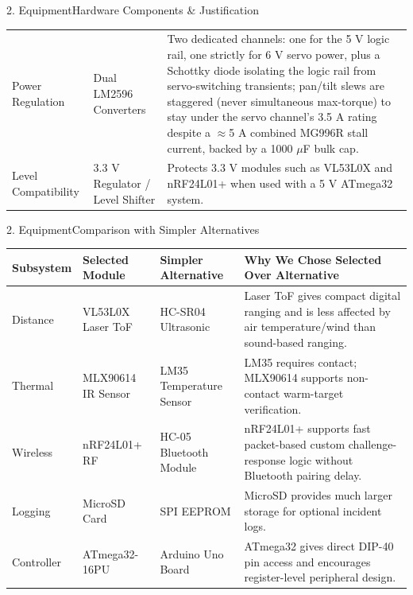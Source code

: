\documentclass[aspectratio=169, 10pt]{beamer}
\begin{document}
\begin{frame}{2. Equipment}{Hardware Components \& Justification}
\begin{table}
\begin{tabular}{p{2.15cm} p{2.85cm} p{5.6cm}}
            Power Regulation & Dual LM2596 Converters & Two dedicated channels: one for the 5 V logic rail, one strictly for 6 V servo power, plus a Schottky diode isolating the logic rail from servo-switching transients; pan/tilt slews are staggered (never simultaneous max-torque) to stay under the servo channel's 3.5 A rating despite a $\approx$5 A combined MG996R stall current, backed by a 1000 $\mu$F bulk cap. \\
            Level Compatibility & 3.3 V Regulator / Level Shifter & Protects 3.3 V modules such as VL53L0X and nRF24L01+ when used with a 5 V ATmega32 system. \\
            \bottomrule
        \end{tabular}
    \end{table}
\end{frame}

\begin{frame}{2. Equipment}{Comparison with Simpler Alternatives}
    \tiny
    \begin{table}
        \centering
        \begin{tabular}{p{1.8cm} p{2.35cm} p{2.45cm} p{4.1cm}}
            \toprule
            \textbf{\color{Accent} Subsystem} & \textbf{\color{Accent} Selected Module} & \textbf{\color{Accent} Simpler Alternative} & \textbf{\color{Accent} Why We Chose Selected Over Alternative} \\
            \midrule
            Distance & VL53L0X Laser ToF & HC-SR04 Ultrasonic & Laser ToF gives compact digital ranging and is less affected by air temperature/wind than sound-based ranging. \\
            Thermal & MLX90614 IR Sensor & LM35 Temperature Sensor & LM35 requires contact; MLX90614 supports non-contact warm-target verification. \\
            Wireless & nRF24L01+ RF & HC-05 Bluetooth Module & nRF24L01+ supports fast packet-based custom challenge-response logic without Bluetooth pairing delay. \\
            Logging & MicroSD Card & SPI EEPROM & MicroSD provides much larger storage for optional incident logs. \\
            Controller & ATmega32-16PU & Arduino Uno Board & ATmega32 gives direct DIP-40 pin access and encourages register-level peripheral design. \\
            \bottomrule
        \end{tabular}
    \end{table}
\end{frame}
\end{document}

